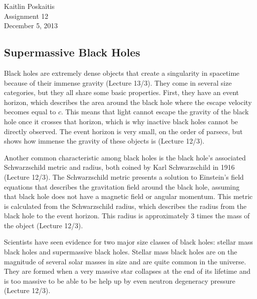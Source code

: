 \documentclass[12pt]{article}
\begin{document}
\noindent Kaitlin Poskaitis\\
Assignment 12\\
December 5, 2013
\begin{center}
    \section*{Supermassive Black Holes}
\end{center}

Black holes are extremely dense objects that create a singularity in spacetime
because of their immense gravity (Lecture 13/3).  They come in several
size categories, but
they all share some basic properties.  First, they have an event horizon, which
describes the area around the black hole where the escape velocity becomes equal
to $c$.  This means that light cannot escape the gravity of the black hole once
it crosses that horizon, which is why inactive black holes cannot be directly
observed.  The event horizon is very small, on the order of parsecs, but shows
how immense the gravity of these objects is (Lecture 12/3).

Another common characteristic among black holes is the black hole's associated
Schwarzschild metric and radius, both coined by Karl Schwarzschild in 1916
(Lecture 12/3).
The Schwarzschild metric presents a solution
to Einstein's field equations that describes the gravitation field around the
black hole, assuming that black hole does not have a magnetic field or angular
momentum.  This metric is calculated from the Schwarzschild radius, which
describes the radius from the black hole to the event horizon.  This radius is
approximately 3 times the mass of the object (Lecture 12/3).

Scientists have seen evidence for two major size classes of black holes:
stellar mass black holes and supermassive black holes.  Stellar mass black holes
are on the magnitude of several solar masses in size and are quite common in the
universe.  They are formed when a very massive star collapses at the end of its
lifetime and is too massive to be able to be help up by even neutron degeneracy
pressure (Lecture 12/3).
\end{document}
